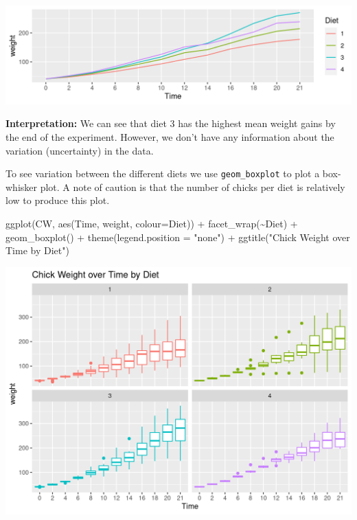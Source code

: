 \documentclass[
  14pt,
]{memoir}
\newenvironment{Shaded}{\begin{snugshade}}{\end{snugshade}}
\newcommand{\AttributeTok}[1]{\textcolor[rgb]{0.77,0.63,0.00}{#1}}
\newcommand{\FunctionTok}[1]{\textcolor[rgb]{0.00,0.00,0.00}{#1}}
\newcommand{\NormalTok}[1]{#1}
\newcommand{\SpecialCharTok}[1]{\textcolor[rgb]{0.00,0.00,0.00}{#1}}
\newcommand{\StringTok}[1]{\textcolor[rgb]{0.31,0.60,0.02}{#1}}
\begin{document}
\begin{center}\includegraphics[width=0.8\linewidth]{figure/minimal-meanlinesPlot-1} \end{center}

\textbf{Interpretation:}
We can see that diet 3 has the highest mean weight gains by the end of the experiment. However,
we don't have any information about the variation (uncertainty) in the data.

To see variation between the different diets we use \texttt{geom\_boxplot} to plot a box-whisker plot.
A note of caution is that the number of chicks per diet is relatively low to produce this plot.

\begin{Shaded}
\begin{Highlighting}[]
\FunctionTok{ggplot}\NormalTok{(CW, }\FunctionTok{aes}\NormalTok{(Time, weight, }\AttributeTok{colour=}\NormalTok{Diet)) }\SpecialCharTok{+}
  \FunctionTok{facet\_wrap}\NormalTok{(}\SpecialCharTok{\textasciitilde{}}\NormalTok{Diet) }\SpecialCharTok{+}
  \FunctionTok{geom\_boxplot}\NormalTok{() }\SpecialCharTok{+}
  \FunctionTok{theme}\NormalTok{(}\AttributeTok{legend.position =} \StringTok{"none"}\NormalTok{) }\SpecialCharTok{+}
  \FunctionTok{ggtitle}\NormalTok{(}\StringTok{"Chick Weight over Time by Diet"}\NormalTok{)}
\end{Highlighting}
\end{Shaded}

\begin{center}\includegraphics[width=0.8\linewidth]{figure/minimal-boxPlot-1} \end{center}
\end{document}

